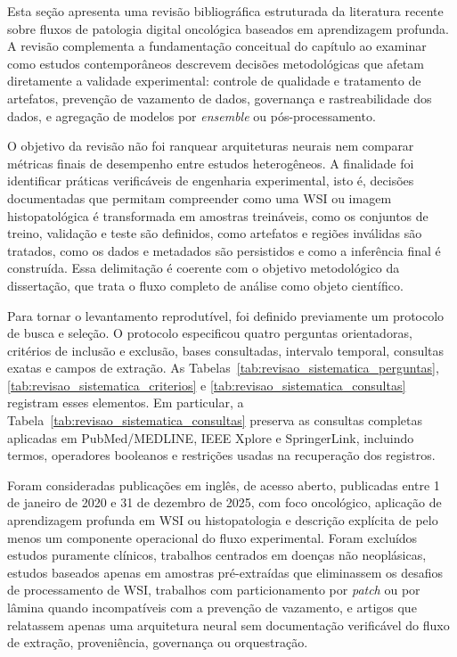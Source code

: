 Esta seção apresenta uma revisão bibliográfica estruturada da literatura recente
sobre fluxos de patologia digital oncológica baseados em aprendizagem profunda.
A revisão complementa a fundamentação conceitual do capítulo ao examinar como
estudos contemporâneos descrevem decisões metodológicas que afetam diretamente a
validade experimental: controle de qualidade e tratamento de artefatos,
prevenção de vazamento de dados, governança e rastreabilidade dos dados, e
agregação de modelos por \textit{ensemble} ou pós-processamento.

O objetivo da revisão não foi ranquear arquiteturas neurais nem comparar
métricas finais de desempenho entre estudos heterogêneos. A finalidade foi
identificar práticas verificáveis de engenharia experimental, isto é, decisões
documentadas que permitam compreender como uma WSI ou imagem histopatológica é
transformada em amostras treináveis, como os conjuntos de treino, validação e
teste são definidos, como artefatos e regiões inválidas são tratados, como os
dados e metadados são persistidos e como a inferência final é construída. Essa
delimitação é coerente com o objetivo metodológico da dissertação, que trata o
fluxo completo de análise como objeto científico.

Para tornar o levantamento reprodutível, foi definido previamente um protocolo
de busca e seleção. O protocolo especificou quatro perguntas orientadoras,
critérios de inclusão e exclusão, bases consultadas, intervalo temporal,
consultas exatas e campos de extração. As
Tabelas~\ref{tab:revisao_sistematica_perguntas},
\ref{tab:revisao_sistematica_criterios} e
\ref{tab:revisao_sistematica_consultas} registram esses elementos. Em
particular, a Tabela~\ref{tab:revisao_sistematica_consultas} preserva as
consultas completas aplicadas em PubMed/MEDLINE, IEEE Xplore e SpringerLink,
incluindo termos, operadores booleanos e restrições usadas na recuperação dos
registros.



Foram consideradas publicações em inglês, de acesso aberto, publicadas entre
1 de janeiro de 2020 e 31 de dezembro de 2025, com foco oncológico, aplicação de
aprendizagem profunda em WSI ou histopatologia e descrição explícita de pelo
menos um componente operacional do fluxo experimental. Foram excluídos estudos
puramente clínicos, trabalhos centrados em doenças não neoplásicas, estudos
baseados apenas em amostras pré-extraídas que eliminassem os desafios de
processamento de WSI, trabalhos com particionamento por \textit{patch} ou por
lâmina quando incompatíveis com a prevenção de vazamento, e artigos que
relatassem apenas uma arquitetura neural sem documentação verificável do fluxo
de extração, proveniência, governança ou orquestração.

